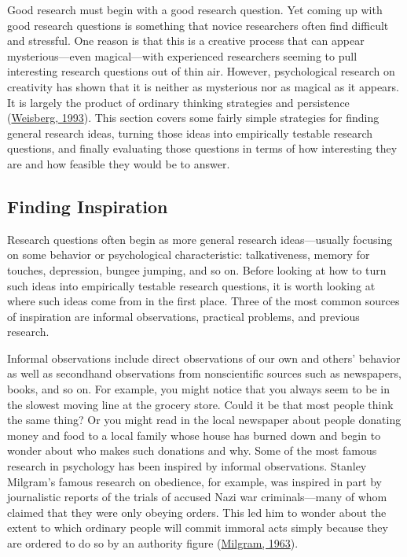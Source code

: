 \documentclass[
]{krantz}
\begin{document}
Good research must begin with a good research question. Yet coming up with good research questions is something that novice researchers often find difficult and stressful. One reason is that this is a creative process that can appear mysterious---even magical---with experienced researchers seeming to pull interesting research questions out of thin air. However, psychological research on creativity has shown that it is neither as mysterious nor as magical as it appears. It is largely the product of ordinary thinking strategies and persistence (\protect\hyperlink{ref-weisberg1993creativity}{Weisberg, 1993}). This section covers some fairly simple strategies for finding general research ideas, turning those ideas into empirically testable research questions, and finally evaluating those questions in terms of how interesting they are and how feasible they would be to answer.

\hypertarget{finding-inspiration}{%
\subsection*{Finding Inspiration}\label{finding-inspiration}}


Research questions often begin as more general research ideas---usually focusing on some behavior or psychological characteristic: talkativeness, memory for touches, depression, bungee jumping, and so on. Before looking at how to turn such ideas into empirically testable research questions, it is worth looking at where such ideas come from in the first place. Three of the most common sources of inspiration are informal observations, practical problems, and previous research.

Informal observations include direct observations of our own and others' behavior as well as secondhand observations from nonscientific sources such as newspapers, books, and so on. For example, you might notice that you always seem to be in the slowest moving line at the grocery store. Could it be that most people think the same thing? Or you might read in the local newspaper about people donating money and food to a local family whose house has burned down and begin to wonder about who makes such donations and why. Some of the most famous research in psychology has been inspired by informal observations. Stanley Milgram's famous research on obedience, for example, was inspired in part by journalistic reports of the trials of accused Nazi war criminals---many of whom claimed that they were only obeying orders. This led him to wonder about the extent to which ordinary people will commit immoral acts simply because they are ordered to do so by an authority figure (\protect\hyperlink{ref-milgram1963behavioral}{Milgram, 1963}).
\end{document}

